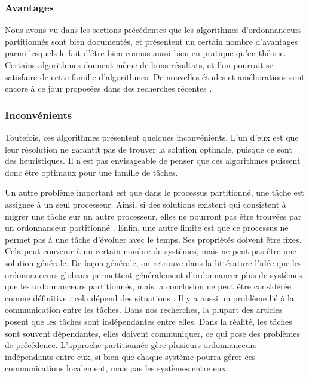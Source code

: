 \documentclass[11pt,a4paper,oneside]{report}
\begin{document}
\subsubsection{Avantages}
Nous avons vu dans les sections précédentes que les algorithmes d'ordonnanceurs 
partitionnés sont bien documentés, et présentent un certain nombre d'avantages parmi lesquels 
le fait d'être bien connus aussi bien en pratique qu'en théorie. 
Certains algorithmes donnent même de bons résultats, et l'on pourrait se satisfaire de 
cette famille d'algorithmes. De nouvelles études et améliorations sont encore à ce jour proposées 
dans des recherches récentes \cite{rodriguez_paul_multi-criteria_2013}.\\

\subsubsection{Inconvénients}
Toutefois, ces algorithmes présentent quelques inconvénients. 
L'un d'eux est que leur résolution ne garantit pas de trouver la solution optimale, 
puisque ce sont des heuristiques. 
Il n'est pas envisageable de penser 
que ces algorithmes puissent donc être optimaux pour une famille de tâches.

Un autre problème important est que dans le processus partitionné, une tâche est 
assignée à un seul processeur. 
Ainsi, si des solutions existent qui consistent à migrer une tâche sur un autre processeur, 
elles ne pourront pas être trouvées 
par un ordonnanceur partitionné \cite{ramamurthy_static-priority_2000}. 
Enfin, une autre limite est que ce processus ne permet pas à une tâche d'évoluer avec le temps. 
Ses propriétés doivent être fixes. 
Cela peut convenir à un certain nombre de systèmes, mais ne peut pas être une solution générale.
De façon générale, on retrouve dans la littérature l'idée que les ordonnanceurs globaux 
permettent généralement d'ordonnancer plus de systèmes que les ordonnanceurs partitionnés, 
mais la conclusion ne peut être considérée comme définitive : cela dépend des situations
\cite{lopez_utilization_2004}.
Il y a aussi un problème lié à la communication entre les tâches. Dans nos recherches, 
la plupart des articles posent que les tâches sont indépendantes entre elles. Dans 
la réalité, les tâches sont souvent dépendantes, elles doivent communiquer, ce qui pose 
des problèmes de précédence. 
L'approche partitionnée gère plusieurs ordonnanceurs indépendants entre eux, si bien 
que chaque système pourra gérer ces communications localement, mais pas les systèmes entre eux. 
\\
\end{document}
